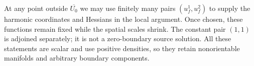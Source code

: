 \begin{remark}\label{data:local-pairs}
At any point outside $\overline{U_0}$ we may use finitely many
pairs $(u_f^1,u_f^2)$ to supply the harmonic coordinates and Hessians
in the local argument. Once chosen, these functions remain fixed
while the spatial scales shrink. The constant pair $(1,1)$ is
adjoined separately; it is not a zero-boundary source solution.
All these statements are scalar and use positive densities, so
they retain nonorientable manifolds and arbitrary boundary components.
\end{remark}
